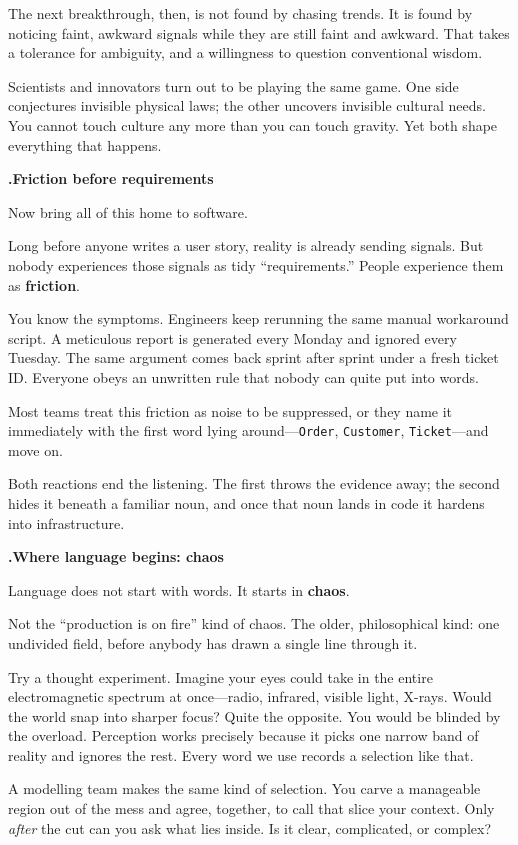 \documentclass[10pt,a4paper]{article}
\newcounter{movement}
\newcounter{sub}[movement]
\renewcommand{\thesub}{\arabic{movement}.\arabic{sub}}
\newcommand{\code}[1]{\texttt{#1}}
\newcommand{\SubHead}[1]{%
  \par\Needspace{5\baselineskip}\stepcounter{sub}\vspace{2mm}%
  {\ttfamily\bfseries\footnotesize\textcolor{G2}{\thesub}\enspace\sffamily\bfseries\normalsize #1\par}%
  \vspace{0.6mm}%
}
\begin{document}
The next breakthrough, then, is not found by chasing trends. It is found by noticing faint, awkward signals while they are still faint and awkward. That takes a tolerance for ambiguity, and a willingness to question conventional wisdom.

Scientists and innovators turn out to be playing the same game. One side conjectures invisible physical laws; the other uncovers invisible cultural needs. You cannot touch culture any more than you can touch gravity. Yet both shape everything that happens.

\SubHead{Friction before requirements}

Now bring all of this home to software.

Long before anyone writes a user story, reality is already sending signals. But nobody experiences those signals as tidy “requirements.” People experience them as \textbf{friction}.

You know the symptoms. Engineers keep rerunning the same manual workaround script. A meticulous report is generated every Monday and ignored every Tuesday. The same argument comes back sprint after sprint under a fresh ticket ID. Everyone obeys an unwritten rule that nobody can quite put into words.

Most teams treat this friction as noise to be suppressed, or they name it immediately with the first word lying around—\code{Order}, \code{Customer}, \code{Ticket}—and move on.

Both reactions end the listening. The first throws the evidence away; the second hides it beneath a familiar noun, and once that noun lands in code it hardens into infrastructure.

\SubHead{Where language begins: chaos}

Language does not start with words. It starts in \textbf{chaos}.

Not the “production is on fire” kind of chaos. The older, philosophical kind: one undivided field, before anybody has drawn a single line through it.

Try a thought experiment. Imagine your eyes could take in the entire electromagnetic spectrum at once—radio, infrared, visible light, X-rays. Would the world snap into sharper focus? Quite the opposite. You would be blinded by the overload. Perception works precisely because it picks one narrow band of reality and ignores the rest. Every word we use records a selection like that.

A modelling team makes the same kind of selection. You carve a manageable region out of the mess and agree, together, to call that slice your context. Only \emph{after} the cut can you ask what lies inside. Is it clear, complicated, or complex?
\end{document}
